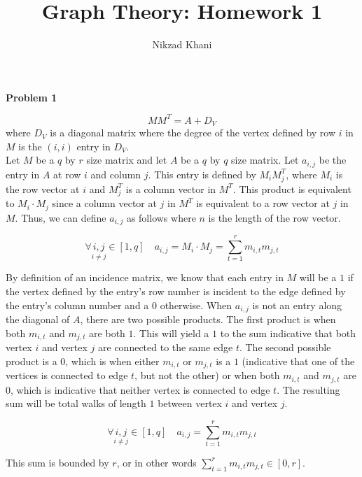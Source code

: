 \documentclass{article}
\title{Graph Theory: Homework 1}
\author{Nikzad Khani}
\begin{document}
\maketitle

\textbf{Problem 1}

\begin{equation}
    MM^T = A + D_V
\end{equation}
where $D_V$ is a diagonal matrix where the degree of the vertex defined by
row $i$ in $M$ is the $(i, i)$ entry in $D_V$.\\

\quad Let $M$ be a $q$ by $r$ size matrix and let $A$ be a $q$ by $q$ size matrix.
Let $a_{i, j}$ be the entry in $A$ at row $i$ and column $j$. This entry
is defined by $M_iM^T_{j}$, where $M_i$ is the row vector at $i$ and $M^T_j$ is
a column vector in $M^T$. This product is equivalent to $M_i \cdot M_j$ since
a column vector at $j$ in $M^T$ is equivalent to a row vector at $j$ in $M$.
Thus, we can define $a_{i, j}$ as follows where $n$ is the length of the row
vector.

\begin{equation}
    \forall \underset{i\neq j}{i,j} \in[1, q]\quad
    a_{i, j} = M_i \cdot M_j = \sum_{t = 1}^{r}m_{i, t}m_{j, t}
\end{equation}

By definition of an incidence matrix, we know that each entry in $M$ will be a
$1$ if the vertex defined by the entry's row number is incident to the edge
defined by the entry's column number and a $0$ otherwise. When $a_{i, j}$ is
not an entry along the diagonal of $A$, there are two possible products.
The first product is when both $m_{i, t}$ and $m_{j, t}$ are both $1$.
This will yield a $1$ to the sum indicative that both vertex $i$ and vertex $j$
are connected to the same edge $t$. The second possible product is a $0$, which
is when either $m_{i, t}$ or $m_{j, t}$ is a $1$ (indicative that one of the
vertices is connected to edge $t$, but not the other) or when both $m_{i, t}$ and
$m_{j, t}$ are $0$, which is indicative that neither vertex is connected to
edge $t$. The resulting sum will be total walks of length $1$ between vertex
$i$ and vertex $j$.

\begin{equation}
    \forall \underset{i\neq j}{i,j} \in[1, q]\quad
    a_{i, j} = \sum_{t = 1}^{r}m_{i, t}m_{j, t}
\end{equation}

This sum is bounded by $r$, or in other words $\sum_{t = 1}^{r}m_{i, t}m_{j, t}
\in [0, r]$.
\end{document}
